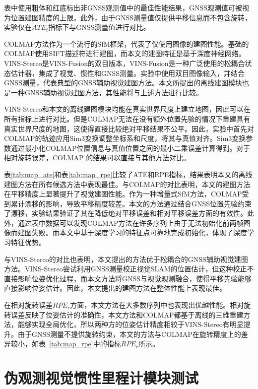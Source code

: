 表中使用粗体和红底标出非GNSS观测值中的最佳性能结果，GNSS观测值可被视为位置建图精度的上限。此外，由于GNSS测量值仅提供平移信息而不包含旋转，实验仅在$ATE_t$指标下与GNSS测量值进行对比。

COLMAP方法作为一个流行的SfM框架，代表了仅使用图像的建图性能。基础的COLMAP使用SIFT\cite{lowe2004distinctive}描述符进行建图，而本文的建图特征是基于深度神经网络。VINS-Stereo是VINS-Fusion的双目版本，VINS-Fusion是一种广泛使用的松耦合状态估计器，集成了视觉、惯性和GNSS测量。实验中使用双目图像输入，并结合GNSS测量，代表典型的GNSS辅助视觉建图方法。本文所提出的离线建图模块也是一种GNSS辅助视觉建图方法，其性能将与上述方法进行比较。

VINS-Stereo和本文的离线建图模块均能在真实世界尺度上建立地图，因此可以在所有指标上进行对比。但是COLMAP无法在没有额外位置先验的情况下重建具有真实世界尺度的地图，这使得直接比较绝对平移结果不公平。因此，实验中首先对COLMAP的轨迹应用Sim3变换调整坐标系和尺度，将其与真值对齐。Sim3变换参数通过最小化COLMAP位置信息与真值位置之间的最小二乘误差计算得到。对于相对旋转误差，COLMAP 的结果可以直接与其他方法对比。

表\ref{tab:map_ate}和表\ref{tab:map_rpe}比较了ATE和RPE指标，结果表明本文的离线建图方法在所有候选方法中表现最佳。与COLMAP的对比表明，本文的建图方法在平移精度上显著提升了视觉建图性能。作为一种增量式SfM方法，COLMAP受到累计漂移的影响，导致平移精度较差。本文的方法通过结合GNSS位置先验约束了漂移，实验结果验证了其在降低绝对平移误差和相对平移误差方面的有效性。此外，通过表中数据可以发现COLMAP方法在许多序列上由于无法初始化前两帧图像而建图失败。而本文中基于深度学习的特征点可靠地完成初始化，体现了深度学习特征优势。

与VINS-Stereo的对比也表明，本文提出的方法优于松耦合的GNSS辅助视觉建图方法。VINS-Stereo尝试利用GNSS测量校正视觉SLAM的位置估计，但这种校正不直接影响位姿优化过程，而本文方法将GNSS与视觉观测融合，使得平移先验能够直接影响位姿估计。因此，本文提出的建图方法在整体性能上表现最佳。

在相对旋转误差$RPE_r$方面，本文方法在大多数序列中也表现出优越性能。相对旋转误差反映了位姿估计的准确性，本文方法和COLMAP都基于离线的三维重建方法，能够实现全局优化，所以两种方的位姿估计精度相较于VINS-Stereo有明显提升。由于GNSS测量不提供旋转约束，本文的方法与COLMAP在旋转精度上的差异较小，如表~\ref{tab:map_rpe}中的指标$RPE_r$所示。

\section{伪观测视觉惯性里程计模块测试}


